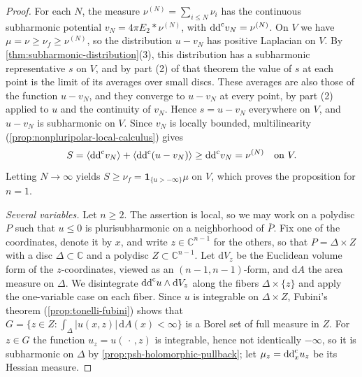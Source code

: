 \begin{proof}
For each $N$, the measure $\nu^{(N)}=\sum_{i\leq N}\nu_i$ has the continuous subharmonic potential $v_N=4\pi E_2*\nu^{(N)}$, with $\mathrm{dd}^{\mathrm{c}} v_N=\nu^{(N)}$. On $V$ we have $\mu=\nu\geq\nu_f\geq\nu^{(N)}$, so the distribution $u-v_N$ has positive Laplacian on $V$. By \cref{thm:subharmonic-distribution}(3), this distribution has a subharmonic representative $s$ on $V$, and by part (2) of that theorem the value of $s$ at each point is the limit of its averages over small discs. These averages are also those of the function $u-v_N$, and they converge to $u-v_N$ at every point, by part (2) applied to $u$ and the continuity of $v_N$. Hence $s=u-v_N$ everywhere on $V$, and $u-v_N$ is subharmonic on $V$. Since $v_N$ is locally bounded, multilinearity (\cref{prop:nonpluripolar-local-calculus}) gives
\[
 S=\langle\mathrm{dd}^{\mathrm{c}} v_N\rangle+\langle\mathrm{dd}^{\mathrm{c}}(u-v_N)\rangle
                                  \geq\mathrm{dd}^{\mathrm{c}} v_N=\nu^{(N)}\quad\text{on }V.
\]
Letting $N\to\infty$ yields $S\geq\nu_f=\mathbf1_{\{u>-\infty\}}\mu$ on $V$, which proves the proposition for $n=1$.

\emph{Several variables.} Let $n\geq2$. The assertion is local, so we may work on a polydisc $P$ such that $u\leq0$ is plurisubharmonic on a neighborhood of $\overline P$. Fix one of the coordinates, denote it by $x$, and write $z\in\mathbb C^{n-1}$ for the others, so that $P=\Delta\times Z$ with a disc $\Delta\subset\mathbb C$ and a polydisc $Z\subset\mathbb C^{n-1}$. Let $\mathrm dV_z$ be the Euclidean volume form of the $z$-coordinates, viewed as an $(n-1,n-1)$-form, and $\mathrm dA$ the area measure on $\Delta$. We disintegrate $\mathrm{dd}^{\mathrm{c}} u\wedge\mathrm dV_z$ along the fibers $\Delta\times\{z\}$ and apply the one-variable case on each fiber. Since $u$ is integrable on $\Delta\times Z$, Fubini's theorem (\cref{prop:tonelli-fubini}) shows that $G=\{z\in Z:\int_\Delta|u(x,z)|\,\mathrm dA(x)<\infty\}$ is a Borel set of full measure in $Z$. For $z\in G$ the function $u_z=u(\,\cdot\,,z)$ is integrable, hence not identically $-\infty$, so it is subharmonic on $\Delta$ by \cref{prop:psh-holomorphic-pullback}; let $\mu_z=\mathrm{dd}^{\mathrm{c}}_xu_z$ be its Hessian measure.


\end{proof}
